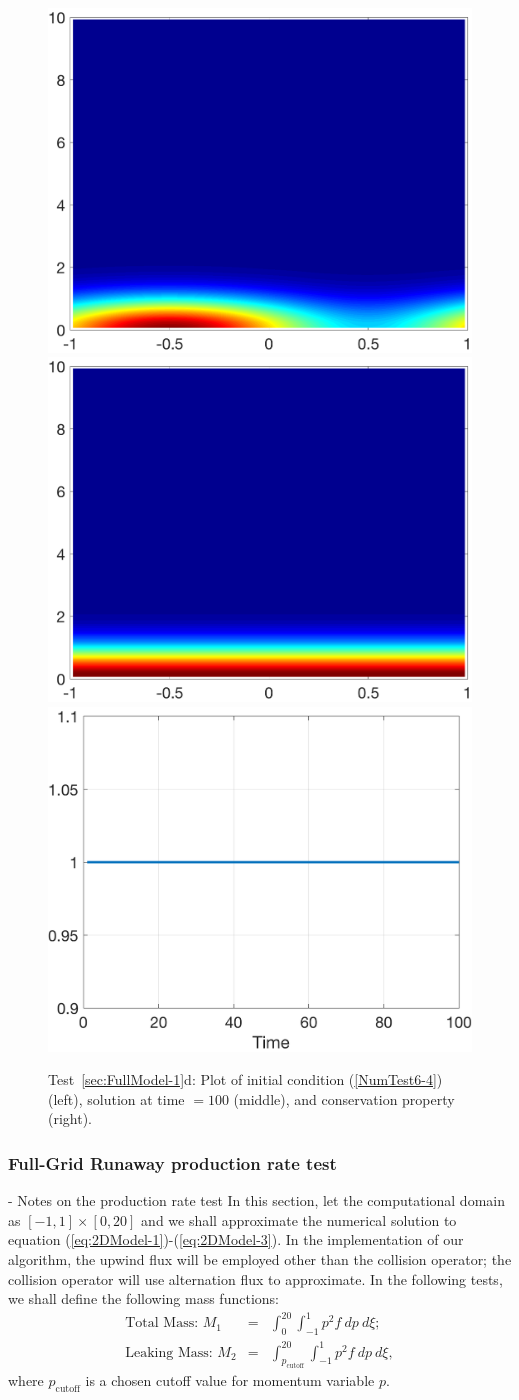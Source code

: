 \documentclass[preprint,11pt]{elsarticle}
\begin{document}
\begin{figure}[H]
\centering
\includegraphics[width=.32\textwidth]{./NumFig/FullModel2D-4-0}
\includegraphics[width=.32\textwidth]{./NumFig/FullModel2D-4-100}
\includegraphics[width=.32\textwidth]{./NumFig/FullModel2D-4-conv}
\caption{Test~\ref{sec:FullModel-1}d: Plot of initial condition (\ref{NumTest6-4}) (left), solution at time $= 100$ (middle), and conservation property (right).}
\end{figure}


\subsubsection{Full-Grid Runaway production rate test}
\label{sec:fokkerplanck2_complete}
- Notes on the production rate test 
In this section, let the computational domain as $[-1,1]\times[0,20]$ and we shall approximate the numerical solution to equation (\ref{eq:2DModel-1})-(\ref{eq:2DModel-3}). In the implementation of our algorithm, the upwind flux will be employed other than the collision operator; the collision operator will use alternation flux to approximate. 
In the following tests, we shall define the following mass functions:
\begin{eqnarray}
    \text{Total Mass: }M_1&=&\int_{0}^{20} \int_{-1}^1 p^2 f \ dp \ d\xi;\label{eq:totalmass}\\
    \text{Leaking Mass: }M_2&=&\int_{p_\text{cutoff}}^{20} \int_{-1}^1 p^2 f \ dp \ d\xi,\label{eq:leakingmass}
\end{eqnarray}
where $p_\text{cutoff}$ is a chosen cutoff value for momentum variable $p.$
\end{document}
